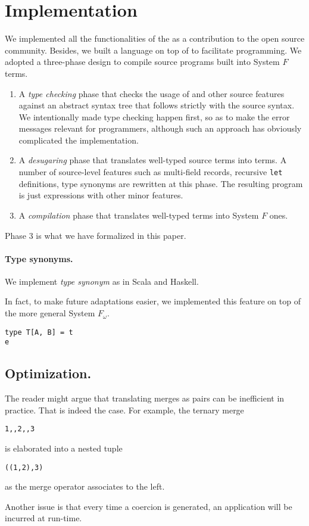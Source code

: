 \section{Implementation}

We implemented all the functionalities of the \name as a contribution to the
open source community. Besides, we built a language on top of \name to
facilitate programming. We adopted a three-phase design to compile source
programs built into System $ F $ terms.

\begin{enumerate}
\item A \emph{type checking} phase that checks the usage of \name and other
  source features against an abstract syntax tree that follows strictly with the
  source syntax. We intentionally made type checking happen first, so as to make
  the error messages relevant for programmers, although such an approach has
  obviously complicated the implementation.

\item A \emph{desugaring} phase that translates well-typed source terms into
  \name terms. A number of source-level features such as multi-field records,
  recursive \texttt{let} definitions, type synonyms are rewritten at this phase.
  The resulting program is just \name expressions with other minor features.

\item A \emph{compilation} phase that translates well-typed \name terms
  into System $ F $ ones.
\end{enumerate}

Phase 3 is what we have formalized in this paper.

\paragraph{Type synonyms.}

We implement \emph{type synonym} as in Scala and Haskell.

In fact, to make future adaptations easier, we implemented this feature on top
of the more general System $ F_{\omega} $.


\begin{lstlisting}
type T[A, B] = t
e
\end{lstlisting}

\subsection{Optimization.}

The reader might argue that translating merges as pairs can be inefficient in
practice. That is indeed the case. For example, the ternary merge
\begin{lstlisting}
1,,2,,3 
\end{lstlisting}
is elaborated into a nested tuple
\begin{lstlisting}
((1,2),3)
\end{lstlisting}
as the merge operator associates to the left.

Another issue is that every time a coercion is generated, an application will be
incurred at run-time.

